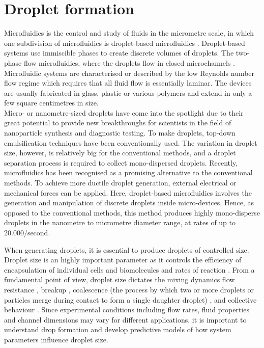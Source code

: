 \section{Droplet formation}

Microfluidics is the control and study of fluids in the micrometre scale, in which one subdivision of microfluidics is droplet-based microfluidics \parencite{Atencia2004, Stone2004}. Droplet-based systems use immiscible phases to create discrete volumes of droplets. The two-phase flow microfluidics, where the droplets flow in closed microchannels \parencite{Pit2015}. Microfluidic systems are characterised or described by the low Reynolds number flow regime which requires that all fluid flow is essentially laminar. The devices are usually fabricated in glass, plastic or various polymers and extend in only a few square centimetres in size. \parencite{Zhu2017,Pit2015,Cole2015} \\

\noindent Micro- or nanometre-sized droplets have come into the spotlight due to their great potential to provide new breakthroughs for scientists in the field of nanoparticle synthesis and diagnostic testing. \parencite{Jeevanandam2018,Bayda2019} To make droplets, top-down emulsification techniques have been conventionally used. The variation in droplet size, however, is relatively big for the conventional methods, and a droplet separation process is required to collect mono-dispersed droplets. Recently, microfluidics has been recognised as a promising alternative to the conventional methods. \parencite{SHARMA2021} To achieve more ductile droplet generation, external electrical or mechanical forces can be applied. Here, droplet-based microfluidics involves the generation and manipulation of discrete droplets inside micro-devices. \parencite{Jensen2004,Belder2005} Hence, as opposed to the conventional methods, this method produces highly mono-disperse droplets in the nanometre to micrometre diameter range, at rates of up to 20.000/second. \parencite{Kobayashi2007} 


\noindent When generating droplets, it is essential to produce droplets of controlled size. Droplet size is an highly important parameter as it controls the efficiency of encapsulation of individual cells and biomolecules and rates of reaction \parencite{Shepherd2021}. From a fundamental point of view, droplet size dictates the mixing dynamics \parencite{Song2006,Huebner2011,Wang2016} flow resistance \parencite{Bithi2010,Baroud2010}, breakup \parencite{Leshansky2012,Hoang2013}, coalescence (the process by which two or more droplets or particles merge during contact to form a single daughter droplet) \parencite{Bithi2014}, and collective behaviour \parencite{Janssen2012,Bithi2015}. Since experimental conditions including flow rates, fluid properties and channel dimensions may vary for different applications, it is important to understand drop formation and develop predictive models of how system parameters influence droplet size.


